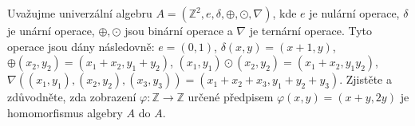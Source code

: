 Uvažujme univerzální algebru 
$A=\left ( \mathbb{Z}^{2},e,\delta,\oplus ,\odot, \nabla \right )$, 
kde $e$ je nulární operace, $\delta$ je unární
operace, $\oplus, \odot$ jsou binární operace a $\nabla$ je ternární
operace. Tyto operace jsou dány následovně: $e=(0,1)$, $\delta(x,y)=(x+1,y)$,
$\oplus(x_{2},y_{2})=(x_{1} + x_{2}, y_{1}+y_{2})$, $(x_{1},y_{1}) \odot
(x_{2},y_{2})=(x_{1}+x_{2},y_{1}y_{2})$, $\nabla ((x_{1},y_{1}),
(x_{2},y_{2}), (x_{3},y_{3})) = (x_{1} + x_{2} + x_{3}, y_{1} + y_{2} + y_{3})$.
Zjistěte a zdůvodněte, zda zobrazení $\varphi : \mathbb{Z} \rightarrow
\mathbb{Z}$ určené předpisem $\varphi(x,y) = (x+y, 2y)$ je homomorfismus algebry
$A$ do $A$.

